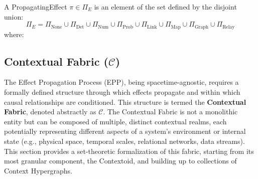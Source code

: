 \begin{definition}[PropagatingEffect]
\label{def:propagating_effect}
 A PropagatingEffect \(\pi \in \Pi_E\) is an element of the set defined by the disjoint union:
\[ \Pi_E = \Pi_{\text{None}} \cup \Pi_{\text{Det}} \cup \Pi_{\text{Num}} \cup \Pi_{\text{Prob}} \cup \Pi_{\text{Link}} \cup \Pi_{\text{Map}} \cup \Pi_{\text{Graph}} \cup \Pi_{\text{Relay}} \]
where:
\end{definition}

\subsection[Contextual Fabric (C)]{Contextual Fabric (\(\mathcal{C}\))}
\label{sec:formalization_context}

The Effect Propagation Process (EPP), being spacetime-agnostic, requires a formally defined structure through which effects propagate and within which causal relationships are conditioned. This structure is termed the \textbf{Contextual Fabric}, denoted abstractly as \(\mathcal{C}\). The Contextual Fabric is not a monolithic entity but can be composed of multiple, distinct contextual realms, each potentially representing different aspects of a system's environment or internal state (e.g., physical space, temporal scales, relational networks, data streams). This section provides a set-theoretic formalization of this fabric, starting from its most granular component, the Contextoid, and building up to collections of Context Hypergraphs.


